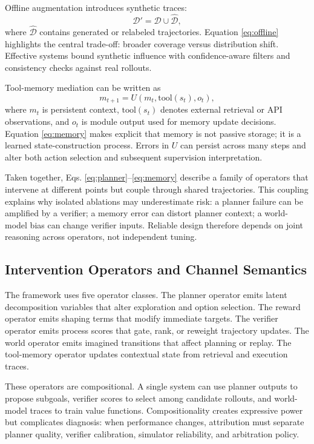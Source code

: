 \documentclass[pdflatex,sn-mathphys-num]{sn-jnl}
\begin{document}
Offline augmentation introduces synthetic traces:
\begin{equation}
\mathcal{D}'=\mathcal{D}\cup\hat{\mathcal{D}},
\label{eq:offline}
\end{equation}
where $\hat{\mathcal{D}}$ contains generated or relabeled trajectories. Equation \eqref{eq:offline} highlights the central trade-off: broader coverage versus distribution shift. Effective systems bound synthetic influence with confidence-aware filters and consistency checks against real rollouts.

Tool-memory mediation can be written as
\begin{equation}
m_{t+1}=U\!\left(m_t,\mathrm{tool}(s_t),o_t\right),
\label{eq:memory}
\end{equation}
where $m_t$ is persistent context, $\mathrm{tool}(s_t)$ denotes external retrieval or API observations, and $o_t$ is module output used for memory update decisions. Equation \eqref{eq:memory} makes explicit that memory is not passive storage; it is a learned state-construction process. Errors in $U$ can persist across many steps and alter both action selection and subsequent supervision interpretation.

Taken together, Eqs. \eqref{eq:planner}--\eqref{eq:memory} describe a family of operators that intervene at different points but couple through shared trajectories. This coupling explains why isolated ablations may underestimate risk: a planner failure can be amplified by a verifier; a memory error can distort planner context; a world-model bias can change verifier inputs. Reliable design therefore depends on joint reasoning across operators, not independent tuning.

\subsection{Intervention Operators and Channel Semantics}
The framework uses five operator classes. The planner operator emits latent decomposition variables that alter exploration and option selection. The reward operator emits shaping terms that modify immediate targets. The verifier operator emits process scores that gate, rank, or reweight trajectory updates. The world operator emits imagined transitions that affect planning or replay. The tool-memory operator updates contextual state from retrieval and execution traces.

These operators are compositional. A single system can use planner outputs to propose subgoals, verifier scores to select among candidate rollouts, and world-model traces to train value functions. Compositionality creates expressive power but complicates diagnosis: when performance changes, attribution must separate planner quality, verifier calibration, simulator reliability, and arbitration policy.
\end{document}
